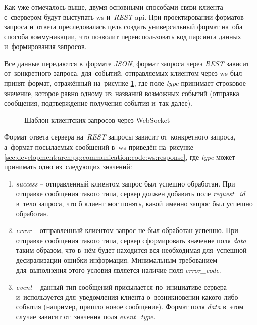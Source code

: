 \subsubsection{}
\label{sec:development:arch:pp:communication}

Как уже отмечалось выше, двумя основными способами связи клиента с~свервером будут выступать \gls{ws} и~\textit{REST} \gls{api}. При проектировании форматов запроса и~ответа преследовалась цель создать универсальный формат на~оба способа коммуникации, что позволит переиспользовать код парсинга данных и~формирования запросов.

Все данные передаются в~формате \textit{JSON}, формат запроса через \textit{REST} зависит от~конкретного запроса, для~событий, отправляемых клиентом через \gls{ws} был принят формат, отражённый на~рисунке \ref{sec:development:arch:pp:communication:code:ws:request}, где поле \textit{type} принимает строковое значение, которое равно одному из~названий возможных событий (отправка сообщения, подтверждение получения события и~так далее).

\begin{figure}[h]
	
   \caption{Шаблон клиентских запросов через WebSocket}
   \label{sec:development:arch:pp:communication:code:ws:request}
\end{figure}

Формат ответа сервера на~\textit{REST} запросы зависит от~конкретного запроса, а~формат посылаемых сообщений в~\gls{ws} приведён на~рисунке \ref{sec:development:arch:pp:communication:code:ws:response}, где \textit{type} может принимать одно из~следующих значений: 

\begin{enumerate}
	\item \textit{success} -- отправленный клиентом запрос был успешно обработан. При отправке сообщения такого типа, сервер должен добавить поле \textit{request\_id} в~тело запроса, что б клиент мог понять, какой именно запрос был успешно обработан.
	\item \textit{error} -- отправленный клиентом запрос не был обработан успешно. При отправке сообщения такого типа, сервер сформировать значение поля \textit{data} таким образом, что в~нём будет находится вся необходимая для~успешной десирализации ошибки информация. Минимальным требованием для~выполнения этого условия является наличие поля \textit{error\_code}.
	\item \textit{event} -- данный тип сообщений присылается по~инициативе сервера и~используется для~уведомления клиента о~возникновении какого-либо события (например, пришло новое сообщение). Формат поля \textit{data} в~этом случае зависит от~значения поля \textit{event\_type}.
\end{enumerate}


